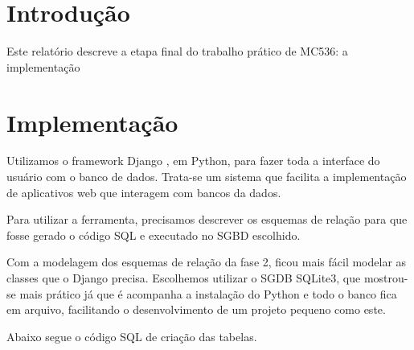 \documentclass[12pt,a4paper]{article}
\begin{document}


\tableofcontents
\listoffigures

\section{Introdução}

Este relatório descreve a etapa final do trabalho prático de MC536: a implementação 

\section{Implementação}

Utilizamos o framework Django \cite{django}, em Python, para fazer toda a interface do usuário
com o banco de dados. Trata-se um sistema que facilita a implementação de aplicativos web que
interagem com bancos da dados.

Para utilizar a ferramenta, precisamos descrever os esquemas de relação para que fosse gerado
o código SQL e executado no SGBD escolhido.

Com a modelagem dos esquemas de relação da fase 2, ficou mais fácil modelar as classes que o Django
precisa. Escolhemos utilizar o SGDB SQLite3, que mostrou-se mais prático já que é acompanha a instalação
do Python e todo o banco fica em arquivo, facilitando o desenvolvimento de um projeto pequeno como este.

Abaixo segue o código SQL de criação das tabelas.
\end{document}
